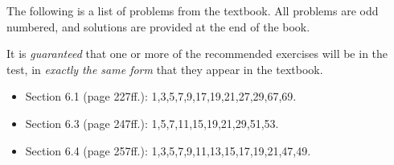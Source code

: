 \documentclass[12pt]{article}
\begin{document}
\sffamily

The following is a list of problems from the textbook. All problems are odd numbered, and solutions are provided at the end of the book.

It is \emph{guaranteed} that one or more of the recommended exercises will be in the test, in \emph{exactly the same form} that they appear in the textbook.

\begin{itemize} 
\item Section 6.1 (page 227ff.): 1,3,5,7,9,17,19,21,27,29,67,69.
\item Section 6.3 (page 247ff.): 1,5,7,11,15,19,21,29,51,53.
\item Section 6.4 (page 257ff.): 1,3,5,7,9,11,13,15,17,19,21,47,49. 
\end{itemize}
\end{document}
